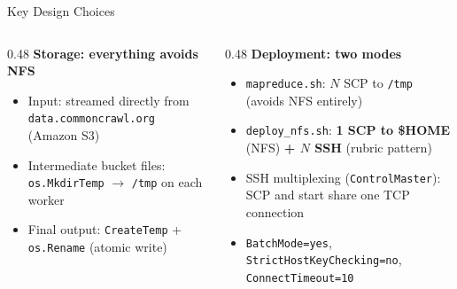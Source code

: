 \documentclass[aspectratio=169,10pt]{beamer}
\begin{document}
\begin{frame}{Key Design Choices}
  \begin{columns}[T,onlytextwidth]
    \begin{column}{0.48\textwidth}
      \textbf{Storage: everything avoids NFS}
      \begin{itemize}
        \item Input: streamed directly from \texttt{data.commoncrawl.org} (Amazon S3)
        \item Intermediate bucket files: \texttt{os.MkdirTemp} $\to$ \texttt{/tmp} on each worker
        \item Final output: \texttt{CreateTemp} + \texttt{os.Rename} (atomic write)
      \end{itemize}
    \end{column}
    \begin{column}{0.48\textwidth}
      \textbf{Deployment: two modes}
      \begin{itemize}
        \item \texttt{mapreduce.sh}: $N$ SCP to \texttt{/tmp} (avoids NFS entirely)
        \item \texttt{deploy\_nfs.sh}: \textbf{1 SCP to \$HOME} (NFS) \textbf{+ $N$ SSH} (rubric pattern)
        \item SSH multiplexing (\texttt{ControlMaster}): SCP and start share one TCP connection
        \item \texttt{BatchMode=yes}, \texttt{StrictHostKeyChecking=no}, \texttt{ConnectTimeout=10}
      \end{itemize}
    \end{column}
  \end{columns}
\end{frame}
\end{document}

